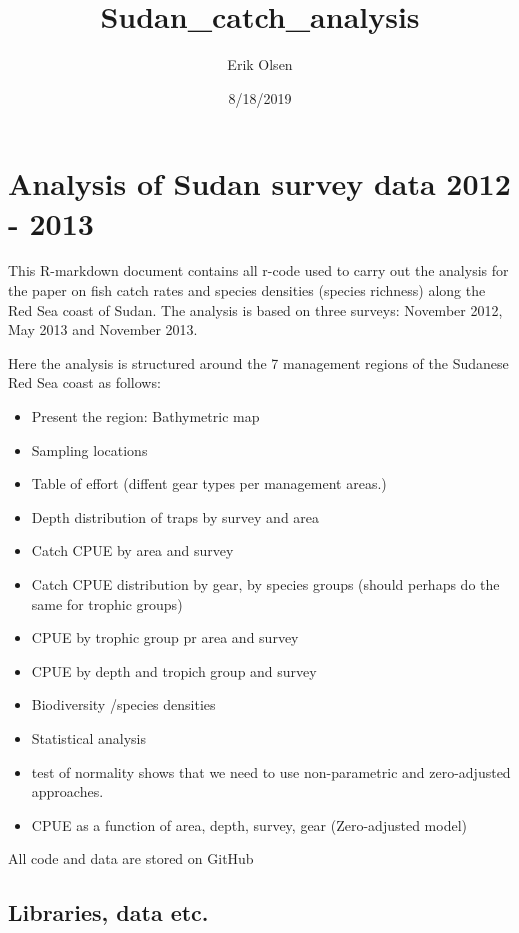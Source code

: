 \documentclass[]{article}
\title{Sudan\_catch\_analysis}
\author{Erik Olsen}
\date{8/18/2019}
\providecommand{\tightlist}{%
  \setlength{\itemsep}{0pt}\setlength{\parskip}{0pt}}
\begin{document}
\maketitle

\section{Analysis of Sudan survey data 2012 -
2013}\label{analysis-of-sudan-survey-data-2012---2013}

This R-markdown document contains all r-code used to carry out the
analysis for the paper on fish catch rates and species densities
(species richness) along the Red Sea coast of Sudan. The analysis is
based on three surveys: November 2012, May 2013 and November 2013.

Here the analysis is structured around the 7 management regions of the
Sudanese Red Sea coast as follows:

\begin{itemize}
\tightlist
\item
  Present the region: Bathymetric map
\item
  Sampling locations
\item
  Table of effort (diffent gear types per management areas.)
\item
  Depth distribution of traps by survey and area
\item
  Catch CPUE by area and survey
\item
  Catch CPUE distribution by gear, by species groups (should perhaps do
  the same for trophic groups)
\item
  CPUE by trophic group pr area and survey
\item
  CPUE by depth and tropich group and survey
\item
  Biodiversity /species densities
\item
  Statistical analysis
\item
  test of normality shows that we need to use non-parametric and
  zero-adjusted approaches.
\item
  CPUE as a function of area, depth, survey, gear (Zero-adjusted model)
\end{itemize}

All code and data are stored on GitHub

\subsection{Libraries, data etc.}\label{libraries-data-etc.}
\end{document}
